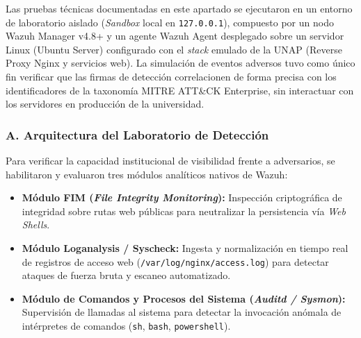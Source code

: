 \begin{tcolorbox}[
    colback=orange!8!white,
    colframe=orange!85!black,
    arc=2mm,
    boxrule=0.9pt,
    title={\textbf{NOTA METODOLÓGICA DE AUDITORÍA DEFENSIVA}},
    fonttitle=\small\sffamily\bfseries,
    coltitle=white
]
\small
Las pruebas técnicas documentadas en este apartado se ejecutaron en un entorno de laboratorio aislado (\textit{Sandbox} local en \texttt{127.0.0.1}), compuesto por un nodo Wazuh Manager v4.8+ y un agente Wazuh Agent desplegado sobre un servidor Linux (Ubuntu Server) configurado con el \textit{stack} emulado de la UNAP (Reverse Proxy Nginx y servicios web). La simulación de eventos adversos tuvo como único fin verificar que las firmas de detección correlacionen de forma precisa con los identificadores de la taxonomía MITRE ATT\&CK Enterprise, sin interactuar con los servidores en producción de la universidad.
\end{tcolorbox}

\subsubsection*{A. Arquitectura del Laboratorio de Detección}

Para verificar la capacidad institucional de visibilidad frente a adversarios, se habilitaron y evaluaron tres módulos analíticos nativos de Wazuh:

\begin{itemize}
    \item \textbf{Módulo FIM (\textit{File Integrity Monitoring}):} Inspección criptográfica de integridad sobre rutas web públicas para neutralizar la persistencia vía \textit{Web Shells}.
    \item \textbf{Módulo Loganalysis / Syscheck:} Ingesta y normalización en tiempo real de registros de acceso web (\texttt{/var/log/nginx/access.log}) para detectar ataques de fuerza bruta y escaneo automatizado.
    \item \textbf{Módulo de Comandos y Procesos del Sistema (\textit{Auditd / Sysmon}):} Supervisión de llamadas al sistema para detectar la invocación anómala de intérpretes de comandos (\texttt{sh}, \texttt{bash}, \texttt{powershell}).
\end{itemize}

